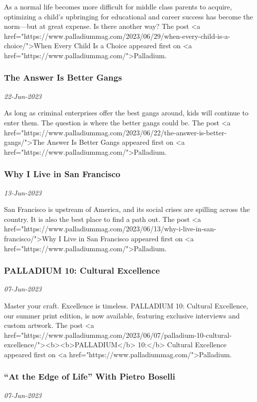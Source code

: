 As a normal life becomes more difficult for middle class parents to acquire, optimizing a child's upbringing for educational and career success has become the norm—but at great expense. Is there another way?
The post <a href="https://www.palladiummag.com/2023/06/29/when-every-child-is-a-choice/">When Every Child Is a Choice
 appeared first on <a href="https://www.palladiummag.com/">Palladium.
\subsubsection{The Answer Is Better Gangs \href{https://www.palladiummag.com/2023/06/22/the-answer-is-better-gangs/}{}}
\textit{22-Jun-2023}

As long as criminal enterprises offer the best gangs around, kids will continue to enter them. The question is where the better gangs could be.
The post <a href="https://www.palladiummag.com/2023/06/22/the-answer-is-better-gangs/">The Answer Is Better Gangs
 appeared first on <a href="https://www.palladiummag.com/">Palladium.
\subsubsection{Why I Live in San Francisco \href{https://www.palladiummag.com/2023/06/13/why-i-live-in-san-francisco/}{}}
\textit{13-Jun-2023}

San Francisco is upstream of America, and its social crises are spilling across the country. It is also the best place to find a path out.
The post <a href="https://www.palladiummag.com/2023/06/13/why-i-live-in-san-francisco/">Why I Live in San Francisco
 appeared first on <a href="https://www.palladiummag.com/">Palladium.
\subsubsection{PALLADIUM 10: Cultural Excellence \href{https://www.palladiummag.com/2023/06/07/palladium-10-cultural-excellence/}{}}
\textit{07-Jun-2023}

Master your craft. Excellence is timeless. PALLADIUM 10: Cultural Excellence, our summer print edition, is now available, featuring exclusive interviews and custom artwork.
The post <a href="https://www.palladiummag.com/2023/06/07/palladium-10-cultural-excellence/"><b><b>PALLADIUM</b> 10:</b> Cultural Excellence
 appeared first on <a href="https://www.palladiummag.com/">Palladium.
\subsubsection{“At the Edge of Life” With Pietro Boselli \href{https://www.palladiummag.com/2023/06/07/at-the-edge-of-life-with-pietro-boselli/}{}}
\textit{07-Jun-2023}

